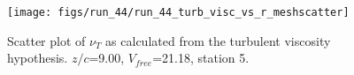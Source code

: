 \begin{figure}[H]
\centering
\texttt{[image: figs/run\_44/run\_44\_turb\_visc\_vs\_r\_meshscatter]}
\caption{Scatter plot of $\nu_T$ as calculated from the turbulent viscosity hypothesis. $z/c$=9.00, $V_{free}$=21.18, station 5.}
\label{fig:run_44_turb_visc_vs_r_meshscatter}
\end{figure}


